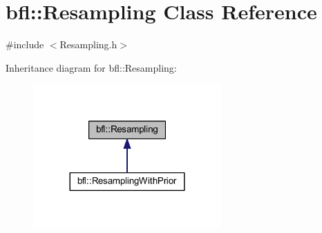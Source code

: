 \hypertarget{classbfl_1_1Resampling}{}\section{bfl\+:\+:Resampling Class Reference}
\label{classbfl_1_1Resampling}


{\ttfamily \#include $<$Resampling.\+h$>$}



Inheritance diagram for bfl\+:\+:Resampling\+:
\nopagebreak
\begin{figure}[H]
\begin{center}
\leavevmode
\includegraphics[width=204pt]{classbfl_1_1Resampling__inherit__graph}
\end{center}
\end{figure}
